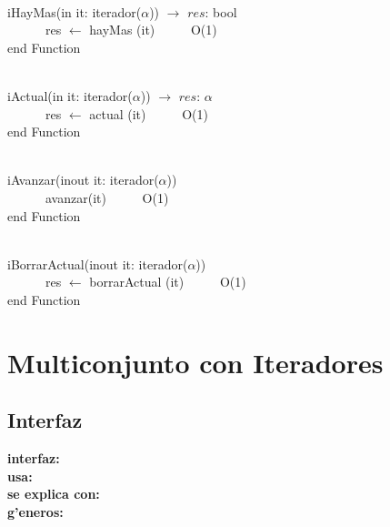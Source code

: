 \documentclass[a4paper,10pt]{article}
\begin{document}
\begin{algoritmo}
\caption{}\\
 iHayMas(in it: iterador($\alpha$)) $\rightarrow$ $res$: bool \ \ \ \ \ \\
	\indent \ \ \ \ \ \  res $\gets$ hayMas (it)  \ \ \ \ \ O(1)\\
   end Function 
\end{algoritmo}

\begin{algoritmo}
\caption{}\\
 iActual(in it: iterador($\alpha$)) $\rightarrow$ $res$: $\alpha$ \ \ \ \ \ \\
	\indent \ \ \ \ \ \  res $\gets$ actual (it)  \ \ \ \ \ O(1)\\
   end Function 
\end{algoritmo}

\begin{algoritmo}
\caption{}\\
 iAvanzar(inout it: iterador($\alpha$)) \ \ \ \ \ \\
	\indent \ \ \ \ \ \  avanzar(it) \ \ \ \ \ O(1)\\
   end Function 
\end{algoritmo}

\begin{algoritmo}
\caption{}\\
 iBorrarActual(inout it: iterador($\alpha$)) \ \ \ \ \ \\
	\indent \ \ \ \ \ \  res $\gets$ borrarActual (it)  \ \ \ \ \ O(1)\\
   end Function 
\end{algoritmo}

\newpage

\section{Multiconjunto con Iteradores}

\subsection{Interfaz}

\indent \noindent \textbf{interfaz:} \\
\indent \textbf{usa:}\\
\indent \textbf{se explica con:} \\
\indent \textbf{g'eneros:} \\
\end{document}
